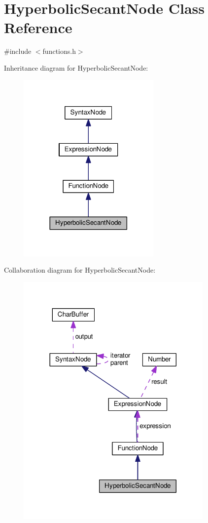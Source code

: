 \hypertarget{classHyperbolicSecantNode}{}\section{Hyperbolic\+Secant\+Node Class Reference}
\label{classHyperbolicSecantNode}


{\ttfamily \#include $<$functions.\+h$>$}



Inheritance diagram for Hyperbolic\+Secant\+Node\+:\nopagebreak
\begin{figure}[H]
\begin{center}
\leavevmode
\includegraphics[width=197pt]{classHyperbolicSecantNode__inherit__graph}
\end{center}
\end{figure}


Collaboration diagram for Hyperbolic\+Secant\+Node\+:\nopagebreak
\begin{figure}[H]
\begin{center}
\leavevmode
\includegraphics[width=272pt]{classHyperbolicSecantNode__coll__graph}
\end{center}
\end{figure}
